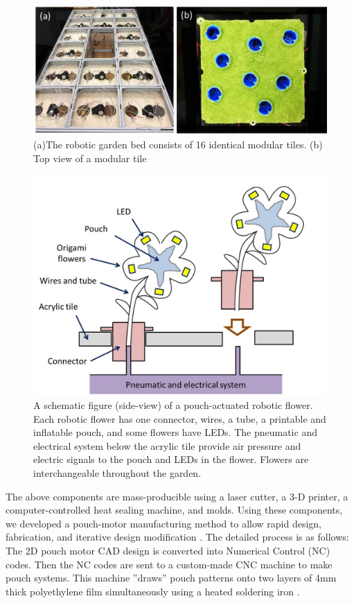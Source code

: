 \documentclass[letterpaper, 10 pt, conference]{ieeeconf}  %
\begin{document}
\begin{figure}[thpb]
	\centering
	\includegraphics[scale=.45]{tabletile.jpg}
	\caption{(a)The robotic garden bed consists of 16 identical modular tiles. (b) Top view of a modular tile}
	\label{tabletile}
\end{figure}

\begin{figure}[thpb]
	\centering
	\includegraphics[scale=.4]{connector.jpg}
	\caption{A schematic figure (side-view) of a pouch-actuated robotic flower. Each robotic flower has one connector, wires, a tube, a printable and inflatable pouch, and some flowers have LEDs. The pneumatic and electrical system below the acrylic tile provide air pressure and electric signals to the pouch and LEDs in the flower. Flowers are interchangeable throughout the garden. }
	\label{connector}
\end{figure}   

The above components are mass-producible using a laser cutter, a 3-D printer, a computer-controlled heat sealing machine, and molds.  Using these components, we developed a pouch-motor manufacturing method to allow rapid design, fabrication, and iterative design modification \cite{NiiyamaIJRR2014}.  The detailed process is as follows: The 2D pouch motor CAD design is converted into Numerical Control (NC) codes. Then the NC codes are sent to a custom-made CNC machine to make pouch systems. This machine ''draws'' pouch patterns onto two layers of 4mm thick polyethylene film simultaneously using a heated soldering iron \cite{NiiyamaIJRR2014}. %
\end{document}
